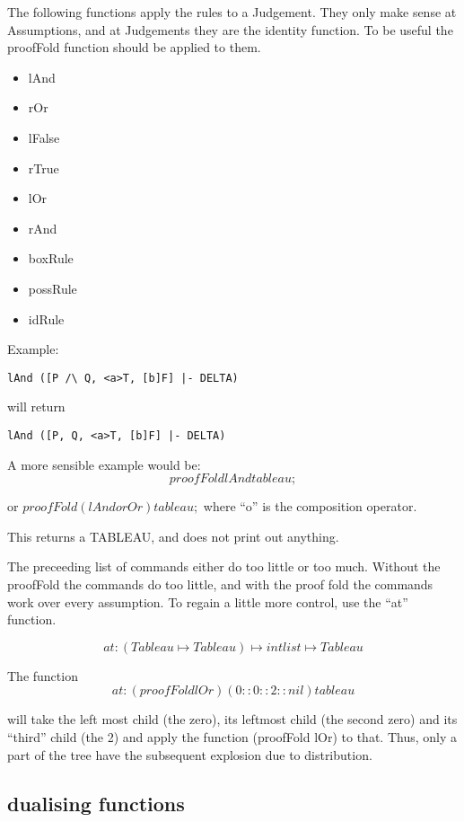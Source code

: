 \documentclass[12pt]{article}
\begin{document}
The following functions apply the rules to a Judgement.
They only make sense at Assumptions, and at Judgements
they are the identity function.  To be useful
the proofFold function should be applied to them.  

\begin{itemize}
\item lAnd
\item rOr
\item lFalse
\item rTrue
\item lOr
\item rAnd
\item boxRule
\item possRule
\item idRule
\end{itemize}


Example:

\begin{verbatim}
lAnd ([P /\ Q, <a>T, [b]F] |- DELTA) 
\end{verbatim}
will return
\begin{verbatim}
lAnd ([P, Q, <a>T, [b]F] |- DELTA) 
\end{verbatim}

A more sensible example would be:
$$ proofFold lAnd tableau; $$

or $proofFold (lAnd o rOr) tableau;$
where ``o'' is the composition operator.

This returns a TABLEAU, and does not print out anything.

The preceeding list of commands either do too little or too much.
Without the proofFold the commands do too little, and with
the proof fold the commands work over every assumption.
To regain a little more control, use the ``at'' function.


$$at : (Tableau \mapsto Tableau) \mapsto int list \mapsto Tableau$$

The function $$at : (proofFold lOr) (0::0::2::nil) tableau$$

will take the left most child (the zero), its leftmost child (the second zero)
and its ``third'' child (the 2) and apply the function (proofFold lOr)
to that.  Thus, only a part of the tree have the subsequent explosion
due to distribution.  

\subsection{dualising functions}
\end{document}
